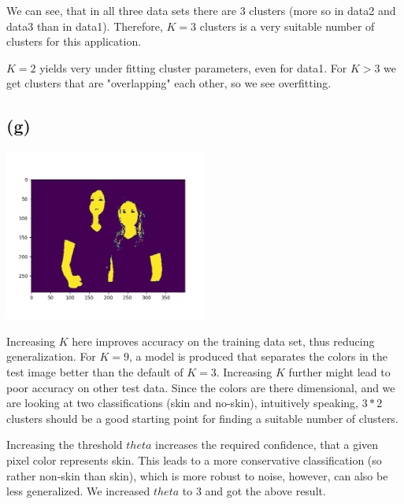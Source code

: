 We can see, that in all three data sets there are 3 clusters (more so in data2 and data3 than in data1). Therefore, $K=3$ clusters is a very suitable number of clusters for this application.

$K=2$ yields very under fitting cluster parameters, even for data1. For $K>3$ we get clusters that are "overlapping" each other, so we see overfitting.


\subsection*{(g)}
\includegraphics[width=0.5\textwidth]{Figure_5.png}

Increasing $K$ here improves accuracy on the training data set, thus reducing generalization. For $K=9$, a model is produced that separates the colors in the test image better than the default of $K=3$. Increasing $K$ further might lead to poor accuracy on other test data. Since the colors are there dimensional, and we are looking at two classifications (skin and no-skin), intuitively speaking, $3*2$ clusters should be a good starting point for finding a suitable number of clusters.

Increasing the threshold $theta$ increases the required confidence, that a given pixel color represents skin. This leads to a more conservative classification (so rather non-skin than skin), which is more robust to noise, however, can also be less generalized. We increased $theta$ to $3$ and got the above result.


